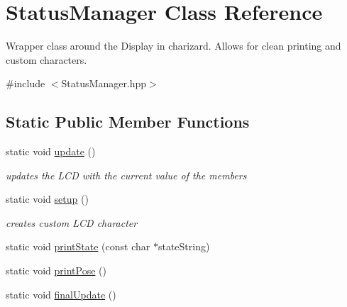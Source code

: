 \hypertarget{classStatusManager}{\section{Status\-Manager Class Reference}
\label{classStatusManager}
}


Wrapper class around the Display in charizard. Allows for clean printing and custom characters.  




{\ttfamily \#include $<$Status\-Manager.\-hpp$>$}

\subsection*{Static Public Member Functions}
\begin{DoxyCompactItemize}
\item 
static void \hyperlink{classStatusManager_a1e349aaaaaafe34873aa39e9dee621b0}{update} ()
\begin{DoxyCompactList}\small\item\em updates the L\-C\-D with the current value of the members \end{DoxyCompactList}\item 
static void \hyperlink{classStatusManager_ad95281dfa485185d334183e9570d85af}{setup} ()
\begin{DoxyCompactList}\small\item\em creates custom L\-C\-D character \end{DoxyCompactList}\item 
static void \hyperlink{classStatusManager_a384e6af33f26993bd070f40fc601eeef}{print\-State} (const char $\ast$state\-String)
\item 
static void \hyperlink{classStatusManager_a9931fbceb4e172cb68ad0e23db6f0a8c}{print\-Pose} ()
\item 
static void \hyperlink{classStatusManager_a7ff2d1d408a9a295a7e7815ce23347c4}{final\-Update} ()
\end{DoxyCompactItemize}
